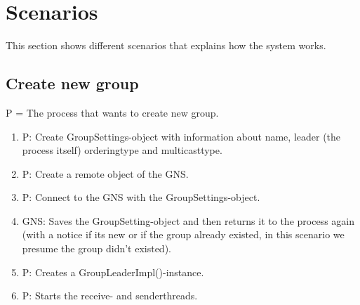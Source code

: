 \documentclass[titlepage, twocolumn, a4paper, 10pt]{article}
\begin{document}
\section{Scenarios}\label{sec:scenarios}
This section shows different scenarios that explains how the system
works.

\subsection{Create new group}
P = The process that wants to create new group.
\begin{enumerate}
\item P: Create GroupSettings-object with information about name,
  leader (the process itself) orderingtype and multicasttype.
\item P: Create a remote object of the GNS.
\item P: Connect to the GNS with the GroupSettings-object.
\item GNS: Saves the GroupSetting-object and then returns it to the
  process again (with a notice if its new or if the group already
  existed, in this scenario we presume the group didn’t existed).
\item P: Creates a GroupLeaderImpl()-instance.
\item P: Starts the receive- and senderthreads.
\end{enumerate}
\end{document}
